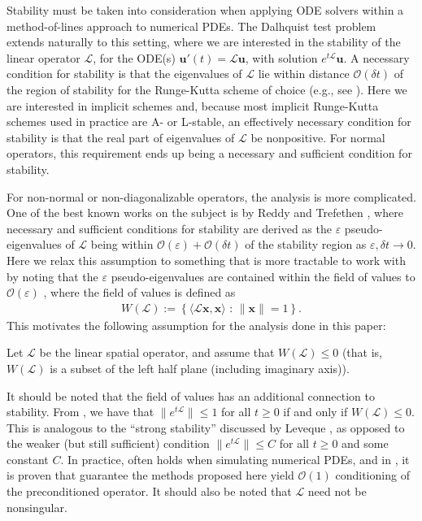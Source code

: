 \documentclass[review]{siamart}
\begin{document}
Stability must be taken into consideration when applying ODE solvers within a
method-of-lines approach to numerical PDEs. The Dalhquist test problem extends
naturally to this setting, where we are interested in the stability of the
linear operator $\mathcal{L}$, for the ODE(s)
$\mathbf{u}'(t) = \mathcal{L}\mathbf{u}$, with solution $e^{t\mathcal{L}}\mathbf{u}$.
A necessary condition for stability is that the eigenvalues of $\mathcal{L}$
lie within distance $\mathcal{O}(\delta t)$ of the region of stability for
the Runge-Kutta scheme of choice (e.g., see \cite{reddy92}). Here we are
interested in implicit schemes and, because most implicit Runge-Kutta schemes
used in practice are A- or L-stable, an effectively necessary condition for
stability is that the real part of eigenvalues of $\mathcal{L}$ be nonpositive.
For normal operators, this requirement ends up being a necessary and sufficient
condition for stability.

For non-normal or non-diagonalizable operators, the analysis is more complicated.
One of the best known works on the subject is by Reddy and Trefethen \cite{reddy92},
where necessary and sufficient conditions for stability are derived as the
$\varepsilon$ pseudo-eigenvalues of $\mathcal{L}$ being within
$\mathcal{O}(\varepsilon) + \mathcal{O}(\delta t)$ of the stability region
as $\varepsilon,\delta t\to 0$. Here we relax this assumption to something
that is more tractable to work with by noting that the $\varepsilon$
pseudo-eigenvalues are contained within the field of values to
$\mathcal{O}(\varepsilon)$ \cite[Eq. (17.9)]{trefethen2005spectra},
where the field of values is defined as
%
\begin{align}\label{eq:fov}
W(\mathcal{L}) := \left\{ \langle \mathcal{L}\mathbf{x},\mathbf{x}\rangle \text{ : }
	\|\mathbf{x}\| = 1 \right\}.
\end{align}
%
This motivates the following assumption for the analysis done in this paper:
%
\begin{assumption} \label{ass:fov}
Let $\mathcal{L}$ be the linear spatial operator, and assume that $W(\mathcal{L}) \leq 0$
(that is, $W(\mathcal{L})$ is a subset of the left half plane (including imaginary axis)).
\end{assumption}
%
It should be noted that the field of values has an additional connection
to stability. From \cite[Theorem 17.1]{trefethen2005spectra}, we have that
$\|e^{t\mathcal{L}}\|\leq 1$ for all $t\geq 0$ if and only if $W(\mathcal{L}) \leq 0$.
This is analogous to the ``strong stability'' discussed by Leveque
\cite[Chapter 9.5]{leveque2007finite}, as opposed to the weaker (but still
sufficient) condition $\|e^{t\mathcal{L}}\|\leq C$ for all $t\geq 0$ and
some constant $C$. In practice,  often holds when
simulating numerical PDEs, and in , it is proven that
 guarantee the methods proposed here yield
$\mathcal{O}(1)$ conditioning of the preconditioned operator. It should
also be noted that $\mathcal{L}$ need not be nonsingular.
\end{document}
